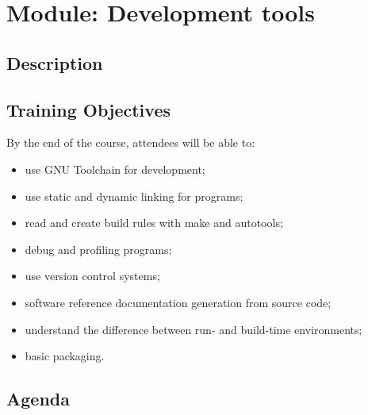 \documentclass[12pt,a4paper,oneside]{article}
\begin{document}
\section{Module: Development tools}

\subsection{Description}


\subsection{Training Objectives}

By the end of the course,  attendees will be able to:
\begin{itemize}
	\item use GNU Toolchain for development;
	\item use static and dynamic linking for programs;
	\item read and create build rules with make and autotools;
	\item debug and profiling programs;
	\item use version control systems;
	\item software reference documentation generation from source code;
	\item understand the difference between run- and build-time environments;
	\item basic packaging.
\end{itemize}


\subsection{Agenda}
\end{document}
